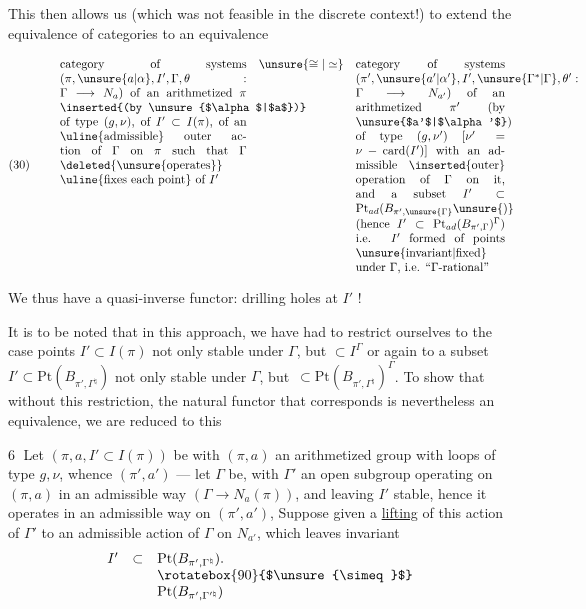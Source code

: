 This then allows us (which was not feasible in the discrete
context!) to extend the equivalence of categories to an equivalence

\[
(30)\qquad
\begin{array}{c@{\quad}c@{\quad}c}
\parbox[t]{0.45\linewidth}{%
category of systems $(\pi,\unsure{a|\alpha},I',\Gamma,\theta:\Gamma\longrightarrow N_a)$
of an arithmetized $\pi$ \inserted{(by \unsure{$\alpha$|$a$})} of type $(g,\nu)$,
of $I'\subset I(\pi)$, of an
\uline{admissible} outer action of $\Gamma$ on $\pi$
such that $\Gamma$ \deleted{\unsure{operates}} \uline{fixes each point} of $I'$
}
& \unsure{\cong|\simeq} &
\parbox[t]{0.36\linewidth}{%
category of systems
$(\pi',\unsure{a'|\alpha'},I',\unsure{\Gamma^{*}|\Gamma},\theta':\Gamma\longrightarrow N_{a'})$
of an arithmetized $\pi'$ (by \unsure{$a'$|$\alpha'$}) of type
$(g,\nu')$ $[\nu'=\nu-\mathrm{card}(I')]$
with an admissible \inserted{outer} operation of $\Gamma$ on it, and
a subset $I'\subset\mathrm{Pt}_{ad}(B_{\pi',\unsure{\Gamma}}\unsure{)}$
(hence $I'\subset\mathrm{Pt}_{ad}(B_{\pi',\Gamma})^\Gamma$)
i.e. $I'$ formed of points \unsure{invariant|fixed} under $\Gamma$, i.e. ``$\Gamma$-rational''
}
\end{array}
\]


We thus have a quasi-inverse functor:
drilling holes at $I'$ !


It is to be noted that in this approach, we have had to restrict ourselves to the case
  points 
$I'\subset I(\pi)$ not only stable under $\Gamma$, but
 $\subset I^\Gamma$
 or again to a subset
$I'\subset\mathrm{Pt}(B_{\pi',\Gamma^{\natural}})$
not only stable under $\Gamma$, but
\,$\subset\mathrm{Pt}(B_{\pi',\Gamma^{\natural}})^\Gamma$.
To show that without this restriction, the natural functor
 that corresponds is nevertheless
an equivalence, we are reduced to this

\textcircled{6} Let $(\pi,a,I'\subset I(\pi))$ be with $(\pi,a)$
an arithmetized   group with loops of type
$g,\nu$, whence $(\pi',a')$ --- let $\Gamma$ be, with $\Gamma'$
an open subgroup operating on $(\pi,a)$ in an admissible way
$(\Gamma\longrightarrow N_a(\pi))$,
and leaving $I'$ stable, hence it operates in an admissible way on
$(\pi',a')$,
Suppose given a \uline{lifting} of this action of $\Gamma'$
to an admissible action of $\Gamma$ on $N_{a'}$, which leaves invariant
\[
\begin{array}{rcl}
I'&\subset&\mathrm{Pt}(B_{\pi',\Gamma^{\natural}}).\\
&&\rotatebox{90}{$\unsure{\simeq}$}\\
&&\mathrm{Pt}(B_{\pi',\Gamma^{\prime\natural}})
\end{array}
\]

